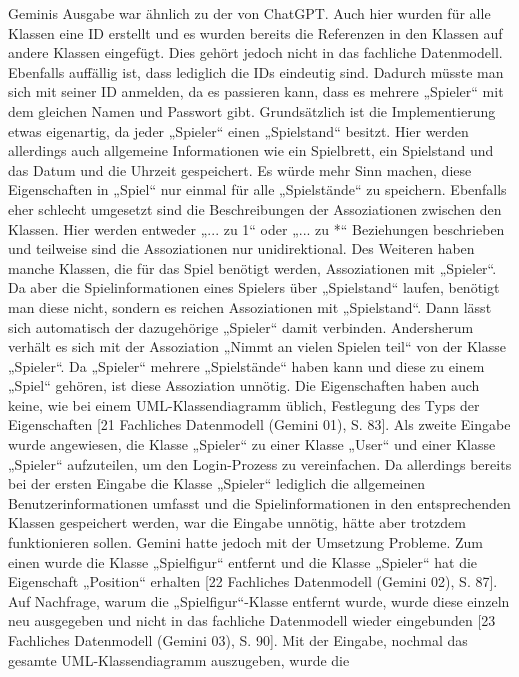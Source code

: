 Geminis Ausgabe war ähnlich zu der von ChatGPT. Auch hier wurden für alle Klassen eine ID erstellt und es wurden bereits die 
Referenzen in den Klassen auf andere Klassen eingefügt. Dies gehört jedoch nicht in das fachliche Datenmodell. Ebenfalls 
auffällig ist, dass lediglich die IDs eindeutig sind. Dadurch müsste man sich mit seiner ID anmelden, da es passieren 
kann, dass es mehrere „Spieler“ mit dem gleichen Namen und Passwort gibt. Grundsätzlich ist die Implementierung etwas 
eigenartig, da jeder „Spieler“ einen „Spielstand“ besitzt. Hier werden allerdings auch allgemeine Informationen wie ein 
Spielbrett, ein Spielstand und das Datum und die Uhrzeit gespeichert. Es würde mehr Sinn machen, diese Eigenschaften in 
„Spiel“ nur einmal für alle „Spielstände“ zu speichern. Ebenfalls eher schlecht umgesetzt sind die Beschreibungen der 
Assoziationen zwischen den Klassen. Hier werden entweder „... zu 1“ oder „... zu *“ Beziehungen beschrieben und teilweise 
sind die Assoziationen nur unidirektional. Des Weiteren haben manche Klassen, die für das Spiel benötigt werden, Assoziationen 
mit „Spieler“. Da aber die Spielinformationen eines Spielers über „Spielstand“ laufen, benötigt man diese nicht, sondern es 
reichen Assoziationen mit „Spielstand“. Dann lässt sich automatisch der dazugehörige „Spieler“ damit verbinden. Andersherum 
verhält es sich mit der Assoziation „Nimmt an vielen Spielen teil“ von der Klasse „Spieler“. Da „Spieler“ mehrere „Spielstände“ 
haben kann und diese zu einem „Spiel“ gehören, ist diese Assoziation unnötig. Die Eigenschaften haben auch keine, wie bei einem 
UML-Klassendiagramm üblich, Festlegung des Typs der Eigenschaften [21 Fachliches Datenmodell (Gemini 01), S. 83]. Als zweite 
Eingabe wurde angewiesen, die Klasse „Spieler“ zu einer Klasse „User“ und einer Klasse „Spieler“ aufzuteilen, um den Login-Prozess 
zu vereinfachen. Da allerdings bereits bei der ersten Eingabe die Klasse „Spieler“ lediglich die allgemeinen Benutzerinformationen 
umfasst und die Spielinformationen in den entsprechenden Klassen gespeichert werden, war die Eingabe unnötig, hätte aber trotzdem 
funktionieren sollen. Gemini hatte jedoch mit der Umsetzung Probleme. Zum einen wurde die Klasse „Spielfigur“ entfernt und die 
Klasse „Spieler“ hat die Eigenschaft „Position“ erhalten [22 Fachliches Datenmodell (Gemini 02), S. 87]. Auf Nachfrage, warum die 
„Spielfigur“-Klasse entfernt wurde, wurde diese einzeln neu ausgegeben und nicht in das fachliche Datenmodell wieder eingebunden 
[23 Fachliches Datenmodell (Gemini 03), S. 90]. Mit der Eingabe, nochmal das gesamte UML-Klassendiagramm auszugeben, wurde die 
